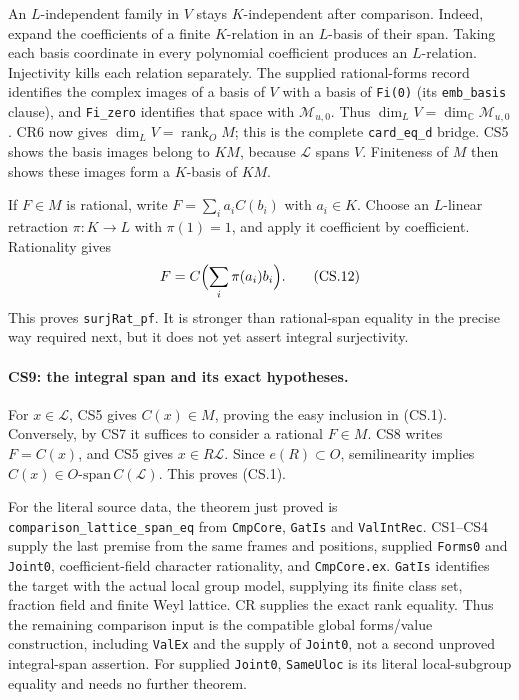 \documentclass[11pt,a4paper]{article}
\numberwithin{equation}{section}
\theoremstyle{remark}\newtheorem{remark}[theorem]{Remark}
\begin{document}
An $L$-independent family in $V$ stays $K$-independent after comparison.
Indeed, expand the coefficients of a finite $K$-relation in an
$L$-basis of their span. Taking each basis coordinate in every
polynomial coefficient produces an $L$-relation. Injectivity kills
each relation separately. The supplied rational-forms record identifies
the complex images of a basis of $V$ with a basis of \texttt{Fi(0)}
(its \texttt{emb\_basis} clause), and \texttt{Fi\_zero} identifies
that space with $\mathcal M_{u,0}$. Thus $\dim_LV=\dim_{\mathbb C}\mathcal M_{u,0}$.
CR6 now gives $\dim_LV=\operatorname{rank}_O M$; this is the complete
\texttt{card\_eq\_d} bridge. CS5 shows the basis images
belong to $KM$, because $\mathcal L$ spans $V$. Finiteness of $M$
then shows these images form a $K$-basis of $KM$.

If $F\in M$ is rational, write $F=\sum_i a_iC(b_i)$ with $a_i\in K$.
Choose an $L$-linear retraction $\pi:K\to L$ with $\pi(1)=1$,
and apply it coefficient by coefficient. Rationality gives
\[
 F=C\Bigl(\sum_i\pi(a_i)b_i\Bigr).                     \tag{CS.12}
\]
This proves \texttt{surjRat\_pf}. It is stronger than rational-span
equality in the precise way required next, but it does not yet assert
integral surjectivity.

\paragraph{CS9: the integral span and its exact hypotheses.}
For $x\in\mathcal L$, CS5 gives $C(x)\in M$, proving the easy
inclusion in (CS.1). Conversely, by CS7 it suffices to consider a
rational $F\in M$. CS8 writes $F=C(x)$, and CS5 gives
$x\in R\mathcal L$. Since $e(R)\subset O$, semilinearity implies
$C(x)\in O\text{-span}\,C(\mathcal L)$. This proves (CS.1).

For the literal source data, the theorem just proved is
\texttt{comparison\_lattice\_span\_eq} from
\texttt{CmpCore}, \texttt{GatIs} and \texttt{ValIntRec}.
CS1--CS4 supply the last premise from the same frames and positions,
supplied \texttt{Forms0} and \texttt{Joint0}, coefficient-field character
rationality, and \texttt{CmpCore.ex}.
\texttt{GatIs} identifies the target with the actual local group
model, supplying its finite class set, fraction field and finite
Weyl lattice. CR supplies the exact rank equality. Thus the remaining
comparison input is the compatible global forms/value construction,
including \texttt{ValEx} and the supply of \texttt{Joint0}, not a second
unproved integral-span assertion. For supplied \texttt{Joint0},
\texttt{SameUloc} is its literal local-subgroup equality and needs
no further theorem.
\end{document}
